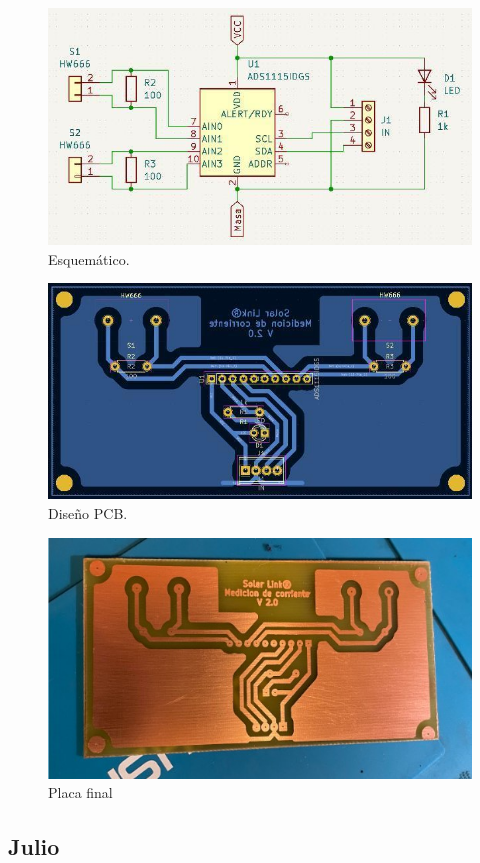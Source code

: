 \begin{figure}[H]
    \centering
    \includegraphics[width=0.75\linewidth]{informes/Screenshot_11.jpg}
    \caption{Esquemático.}
    
\end{figure}

\begin{figure}[H]
    \centering
    \includegraphics[width=0.75\linewidth]{informes/Screenshot_12.jpg}
    \caption{Diseño PCB.}
    
\end{figure}

\begin{figure}[H]
    \centering
    \includegraphics[width=0.75\linewidth]{informes/Screenshot_27.jpg}
    \caption{Placa final}
    
\end{figure}

\subsection{Julio}


